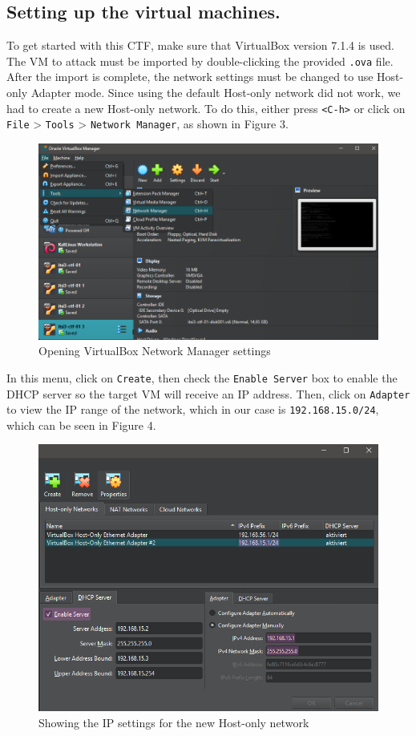 \documentclass[a4paper]{article}
\newcommand{\abc}{\hfill \break}
\begin{document}
\subsection{Setting up the virtual machines.}
To get started with this CTF, make sure that VirtualBox version 7.1.4 is used. The VM to attack must be imported by double-clicking the provided \texttt{.ova} file. After the import is complete, the network settings must be changed to use Host-only Adapter mode. Since using the default Host-only network did not work, we had to create a new Host-only network. To do this, either press \texttt{<C-h>} or click on \texttt{File} > \texttt{Tools} > \texttt{Network Manager}, as shown in Figure 3.
\begin{figure}[h]
	\includegraphics[scale=0.285]{./images/openingNetworkManager.png}
	\centering
	\caption{Opening VirtualBox Network Manager settings}
\end{figure}\abc
In this menu, click on \texttt{Create}, then check the \texttt{Enable Server} box to enable the DHCP server so the target VM will receive an IP address. Then, click on \texttt{Adapter} to view the IP range of the network, which in our case is \texttt{192.168.15.0/24}, which can be seen in Figure 4.
\begin{figure}[h]
	\includegraphics[scale=0.4]{./images/nwipsfr.png}
	\centering
	\caption{Showing the IP settings for the new Host-only network}
	\label{fig:nwconf}
\end{figure}\abc
\end{document}
